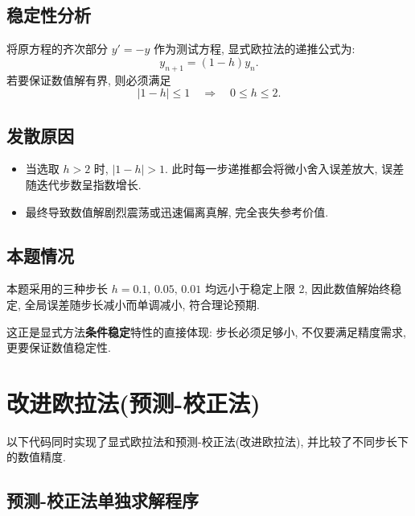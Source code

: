\documentclass[12pt,a4paper]{ctexart}
\begin{document}
\subsection*{稳定性分析}
将原方程的齐次部分 $y' = -y$ 作为测试方程, 显式欧拉法的递推公式为: 
\[
y_{n+1} = (1 - h) y_n.
\]
若要保证数值解有界, 则必须满足
\[
|1 - h| \le 1 \quad\Longrightarrow\quad 0 \le h \le 2.
\]

\subsection*{发散原因}
\begin{itemize}
    \item 当选取 $h > 2$ 时, $|1 - h| > 1$. 此时每一步递推都会将微小舍入误差放大, 误差随迭代步数呈指数增长. 
    \item 最终导致数值解剧烈震荡或迅速偏离真解, 完全丧失参考价值. 
\end{itemize}

\subsection*{本题情况}
本题采用的三种步长 $h=0.1,\,0.05,\,0.01$ 均远小于稳定上限 2, 因此数值解始终稳定, 全局误差随步长减小而单调减小, 符合理论预期. 

这正是显式方法\textbf{条件稳定}特性的直接体现: 步长必须足够小, 不仅要满足精度需求, 更要保证数值稳定性. 
\section{改进欧拉法(预测-校正法)}
以下代码同时实现了显式欧拉法和预测-校正法(改进欧拉法), 并比较了不同步长下的数值精度. 

\subsection{预测-校正法单独求解程序}
\end{document}
